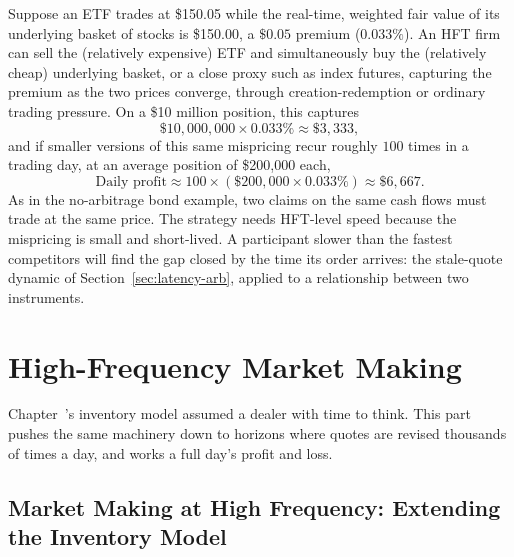 \documentclass[../ai_in_finance]{subfiles}
\begin{document}
Suppose an ETF trades at \$150.05 while the real-time, weighted fair value of its underlying basket of stocks is \$150.00, a $\$0.05$ premium ($0.033\%$). An HFT firm can sell the (relatively expensive) ETF and simultaneously buy the (relatively cheap) underlying basket, or a close proxy such as index futures, capturing the premium as the two prices converge, through creation-redemption or ordinary trading pressure. On a \$10 million position, this captures
\begin{equation*}
\$10{,}000{,}000 \times 0.033\% \approx \$3{,}333,
\end{equation*}
and if smaller versions of this same mispricing recur roughly $100$ times in a trading day, at an average position of \$200,000 each,
\begin{equation*}
\text{Daily profit} \approx 100 \times (\$200{,}000 \times 0.033\%) \approx \$6{,}667.
\end{equation*}
As in the no-arbitrage bond example, two claims on the same cash flows must trade at the same price. The strategy needs HFT-level speed because the mispricing is small and short-lived. A participant slower than the fastest competitors will find the gap closed by the time its order arrives: the stale-quote dynamic of Section~\ref{sec:latency-arb}, applied to a relationship between two instruments.

\section{High-Frequency Market Making}

Chapter~'s inventory model assumed a dealer with time to think. This part pushes the same machinery down to horizons where quotes are revised thousands of times a day, and works a full day's profit and loss.

\subsection{Market Making at High Frequency: Extending the Inventory Model}
\label{sec:hf-inventory}
\end{document}

